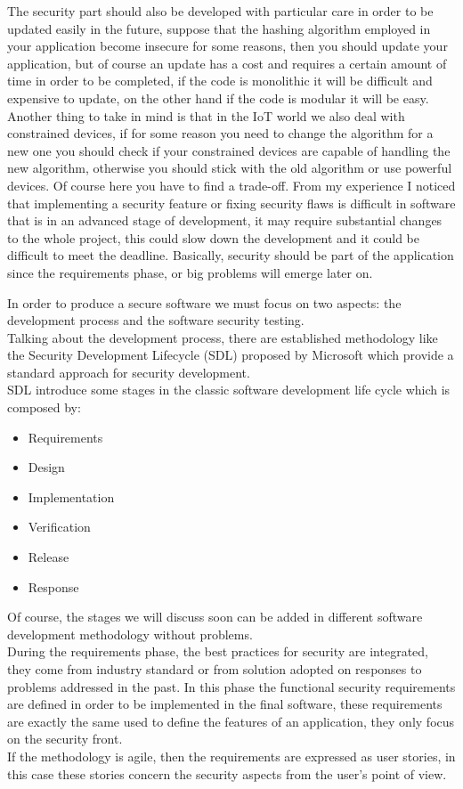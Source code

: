 The security part should also be developed with particular care in order to be updated easily in the future, suppose that the hashing algorithm employed in your application become insecure for some reasons, then you should update your application, but of course an update has a cost and requires a certain amount of time in order to be completed, if the code is monolithic it will be difficult and expensive to update, on the other hand if the code is modular it will be easy.\newline
Another thing to take in mind is that in the IoT world we also deal with constrained devices, if for some reason you need to change the algorithm for a new one you should check if your constrained devices are capable of handling the new algorithm, otherwise you should stick with the old algorithm or use powerful devices. Of course here you have to find a trade-off.\newline
From my experience I noticed that implementing a security feature or fixing security flaws is difficult in software that is in an advanced stage of development, it may require substantial changes to the whole project, this could slow down the development and it could be difficult to meet the deadline.\newline
Basically, security should be part of the application since the requirements phase, or big problems will emerge later on.\newline

In order to produce a secure software we must focus on two aspects: the development process and the software security testing.\\
Talking about the development process, there are established methodology like the Security Development Lifecycle (SDL) proposed by Microsoft\cite{microsoftsdl} which provide a standard approach for security development.\\
SDL introduce some stages in the classic software development life cycle which is composed by:
\begin{itemize}
	\item Requirements
	\item Design
	\item Implementation
	\item Verification
	\item Release
	\item Response
\end{itemize}
Of course, the stages we will discuss soon can be added in different software development methodology without problems.\\
During the requirements phase, the best practices for security are integrated, they come from industry standard or from
solution adopted on responses to problems addressed in the past.
In this phase the functional security requirements are defined in order to be implemented in the final software, 
these requirements are exactly the same used to define the features of an application, they only focus on the security front.\\
If the methodology is agile, then the requirements are expressed as user stories, in this case these stories concern the security aspects from the user's point of view.\\

